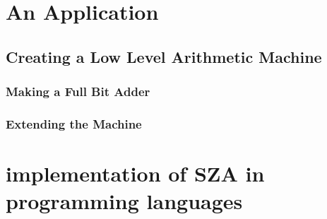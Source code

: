 \documentclass[12pt]{report}
\theoremstyle{definition}
\theoremstyle{remark}
\begin{document}
\chapter{An Application}
  \section{Creating a Low Level Arithmetic Machine}
    \subsection{Making a Full Bit Adder}

    \subsection{Extending the Machine}

\newpage

\chapter{implementation of SZA in programming languages}
\end{document}
